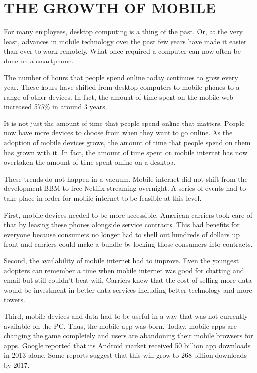 \section[The growth of mobile]{THE GROWTH OF MOBILE}

For many employees, desktop computing is a thing of the past.
Or, at the very least, advances in mobile technology over the past few years
have made it easier than ever to work remotely.
What once required a computer can now often be done on a smartphone.

The number of hours that people spend online today continues
to grow every year. These hours have shifted from desktop computers
to mobile phones to a range of other devices. In fact, the amount
of time spent on the mobile web increased 575\% in around 3 years.

It is not just the amount of time that people spend online that matters.
People now have more devices to choose from when they want to go online.
As the adoption of mobile devices grows, the amount of time that
people spend on them has grown with it. In fact, the amount of time
spent on mobile internet has now overtaken the amount of time spent online on a desktop.

These trends do not happen in a vacuum. Mobile internet did not shift from
the development BBM to free Netflix streaming overnight. A series of events
had to take place in order for mobile internet to be feasible at this level.

First, mobile devices needed to be more accessible. American carriers took care
of that by leasing these phones alongside service contracts. This had benefits
for everyone because consumers no longer had to shell out hundreds of dollars
up front and carriers could make a bundle by locking those consumers into contracts.

Second, the availability of mobile internet had to improve. Even the youngest
adopters can remember a time when mobile internet was good for chatting
and email but still couldn’t beat wifi. Carriers knew that the cost of
selling more data would be investment in better data services including
better technology and more towers.

Third, mobile devices and data had to be useful in a way that was not
currently available on the PC. Thus, the mobile app was born. Today, mobile
apps are changing the game completely and users are abandoning their
mobile browsers for apps. Google reported that its Android market
received 50 billion app downloads in 2013 alone.
Some reports suggest that this will grow to 268 billion downloads by 2017.

